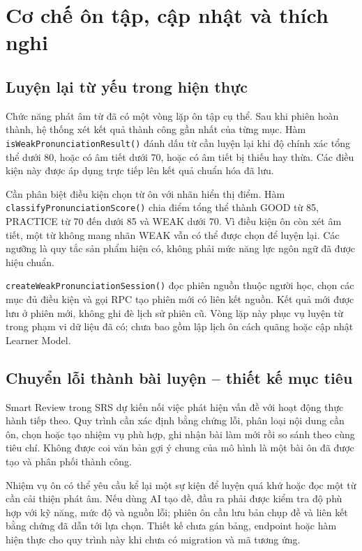 \documentclass[12pt,a4paper,oneside]{report}
\begin{document}
\section{Cơ chế ôn tập, cập nhật và thích nghi}

\subsection{Luyện lại từ yếu trong hiện thực}

Chức năng phát âm từ đã có một vòng lặp ôn tập cụ thể. Sau khi phiên hoàn thành, hệ thống xét kết quả thành công gần nhất của từng mục. Hàm \texttt{isWeakPronunciationResult()} đánh dấu từ cần luyện lại khi độ chính xác tổng thể dưới 80, hoặc có âm tiết dưới 70, hoặc có âm tiết bị thiếu hay thừa. Các điều kiện này được áp dụng trực tiếp lên kết quả chuẩn hóa đã lưu.

Cần phân biệt điều kiện chọn từ ôn với nhãn hiển thị điểm. Hàm \texttt{classifyPronunciationScore()} chia điểm tổng thể thành GOOD từ 85, PRACTICE từ 70 đến dưới 85 và WEAK dưới 70. Vì điều kiện ôn còn xét âm tiết, một từ không mang nhãn WEAK vẫn có thể được chọn để luyện lại. Các ngưỡng là quy tắc sản phẩm hiện có, không phải mức năng lực ngôn ngữ đã được hiệu chuẩn.

\texttt{createWeakPronunciationSession()} đọc phiên nguồn thuộc người học, chọn các mục đủ điều kiện và gọi RPC tạo phiên mới có liên kết nguồn. Kết quả mới được lưu ở phiên mới, không ghi đè lịch sử phiên cũ. Vòng lặp này phục vụ luyện từ trong phạm vi dữ liệu đã có; chưa bao gồm lập lịch ôn cách quãng hoặc cập nhật Learner Model.

\subsection{Chuyển lỗi thành bài luyện -- thiết kế mục tiêu}

Smart Review trong SRS dự kiến nối việc phát hiện vấn đề với hoạt động thực hành tiếp theo. Quy trình cần xác định bằng chứng lỗi, phân loại nội dung cần ôn, chọn hoặc tạo nhiệm vụ phù hợp, ghi nhận bài làm mới rồi so sánh theo cùng tiêu chí. Không được coi văn bản gợi ý chung của mô hình là một bài ôn đã được tạo và phân phối thành công.

Nhiệm vụ ôn có thể yêu cầu kể lại một sự kiện để luyện quá khứ hoặc đọc một từ cần cải thiện phát âm. Nếu dùng AI tạo đề, đầu ra phải được kiểm tra độ phù hợp với kỹ năng, mức độ và nguồn lỗi; phiên ôn cần lưu bản chụp đề và liên kết bằng chứng đã dẫn tới lựa chọn. Thiết kế chưa gán bảng, endpoint hoặc hàm hiện thực cho quy trình này khi chưa có migration và mã tương ứng.
\end{document}
